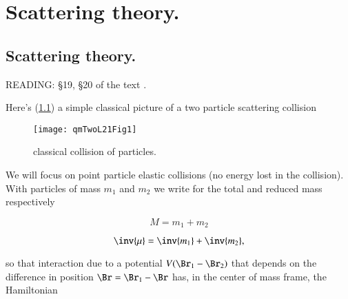 %
%

\chapter{Scattering theory.}
\label{chap:qmTwoL21}
{}
\date{Nov 23, 2011}

\beginArtWithToc

%
%
\section{Scattering theory.}

READING: \S 19, \S 20 of the text \cite{desai2009quantum}.

Here's (\ref{fig:qmTwoL21:qmTwoL21Fig1}) a simple classical picture of a two particle scattering collision

\begin{figure}[htp]
   \centering
   \texttt{[image: qmTwoL21Fig1]}
   \caption{classical collision of particles.}\label{fig:qmTwoL21:qmTwoL21Fig1}
\end{figure}

We will focus on point particle elastic collisions (no energy lost in the collision).  With particles of mass $m_1$ and $m_2$ we write for the total and reduced mass respectively

\begin{equation}\label{eqn:qmTwoL21:10}
M = m_1 + m_2
\end{equation}

\begin{equation}\label{eqn:qmTwoL21:30}
\inv{\mu} = \inv{m_1} + \inv{m_2},
\end{equation}

so that interaction due to a potential $V(\Br_1 - \Br_2)$ that depends on the difference in position $\Br = \Br_1 - \Br$ has, in the center of mass frame, the Hamiltonian


